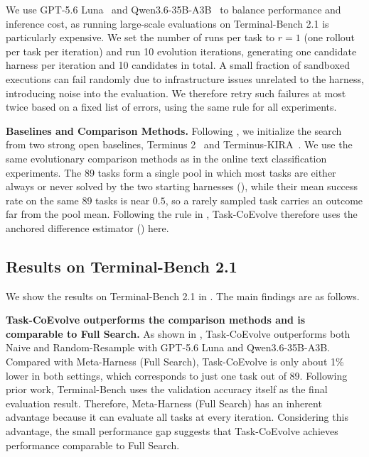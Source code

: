 \documentclass{article} %
\begin{document}
We use GPT-5.6 Luna~\citep{openai2026gpt56} and Qwen3.6-35B-A3B~\citep{qwen36_35b_a3b} to balance performance and inference cost, as running large-scale evaluations on Terminal-Bench 2.1 is particularly expensive. We set the number of runs per task to $r=1$ (one rollout per task per iteration) and run 10 evolution iterations, generating one candidate harness per iteration and 10 candidates in total.
A small fraction of sandboxed executions can fail randomly due to infrastructure issues unrelated to the harness, introducing noise into the evaluation. We therefore retry such failures at most twice based on a fixed list of errors, using the same rule for all experiments.



\textbf{Baselines and Comparison Methods.}
Following \citet{lee2026meta}, we initialize the search from two strong open baselines, Terminus 2~\citep{merrill2026terminal} and Terminus-KIRA~\citep{terminuskira2026}. We use the same evolutionary comparison methods as in the online text classification experiments. The 89 tasks form a single pool in which most tasks are either always or never solved by the two starting harnesses (), while their mean success rate on the same 89 tasks is near $0.5$, so a rarely sampled task carries an outcome far from the pool mean. Following the rule in , Task-CoEvolve therefore uses the anchored difference estimator () here.



\subsection{Results on Terminal-Bench 2.1}
\label{subsec:result_terminal}


We show the results on Terminal-Bench 2.1 in .
The main findings are as follows.

\textbf{Task-CoEvolve outperforms the comparison methods and is comparable to Full Search.}
As shown in , Task-CoEvolve outperforms both Naive and Random-Resample with GPT-5.6 Luna and Qwen3.6-35B-A3B. Compared with Meta-Harness (Full Search), Task-CoEvolve is only about 1\% lower in both settings, which corresponds to just one task out of 89. Following prior work, Terminal-Bench uses the validation accuracy itself as the final evaluation result. Therefore, Meta-Harness (Full Search) has an inherent advantage because it can evaluate all tasks at every iteration. Considering this advantage, the small performance gap suggests that Task-CoEvolve achieves performance comparable to Full Search.
\end{document}

